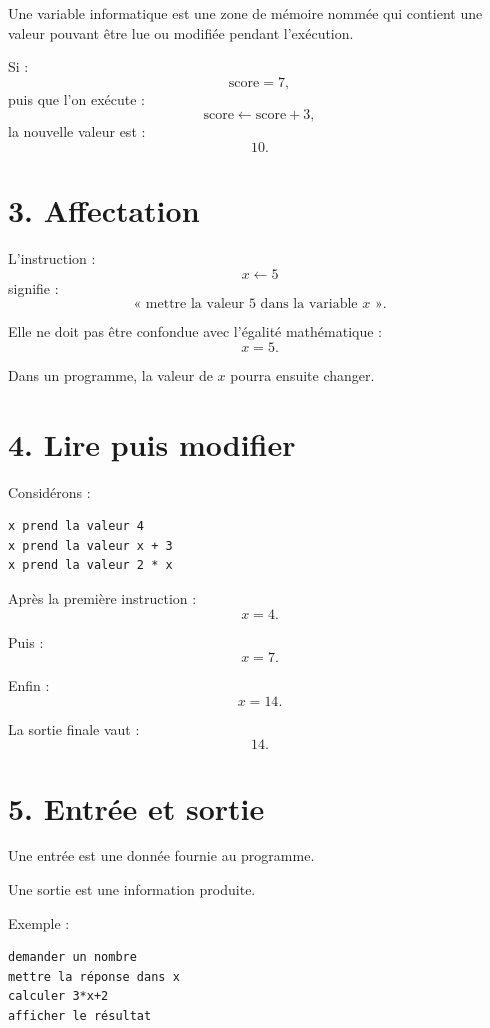 \begin{definition}
Une variable informatique est une zone de mémoire nommée qui contient une valeur pouvant être lue ou modifiée pendant l'exécution.
\end{definition}


Si :
\[
\text{score}=7,
\]
puis que l'on exécute :
\[
\text{score}\leftarrow\text{score}+3,
\]
la nouvelle valeur est :
\[
10.
\]

\section{3. Affectation}

L'instruction :
\[
x\leftarrow5
\]
signifie :
\[
\text{« mettre la valeur }5\text{ dans la variable }x\text{ »}.
\]

Elle ne doit pas être confondue avec l'égalité mathématique :
\[
x=5.
\]

Dans un programme, la valeur de $x$ pourra ensuite changer.

\section{4. Lire puis modifier}

Considérons :
\begin{verbatim}
x prend la valeur 4
x prend la valeur x + 3
x prend la valeur 2 * x
\end{verbatim}

Après la première instruction :
\[
x=4.
\]

Puis :
\[
x=7.
\]

Enfin :
\[
x=14.
\]

La sortie finale vaut :
\[
\boxed{14}.
\]

\section{5. Entrée et sortie}

Une entrée est une donnée fournie au programme.

Une sortie est une information produite.

Exemple :
\begin{verbatim}
demander un nombre
mettre la réponse dans x
calculer 3*x+2
afficher le résultat
\end{verbatim}

